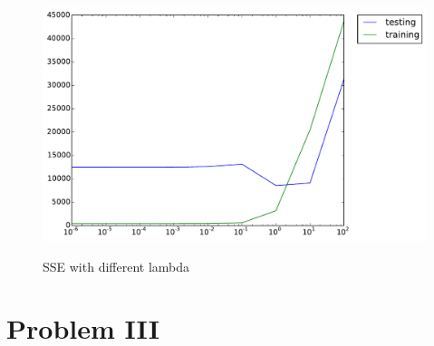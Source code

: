 \documentclass{article}
\begin{document}
    \begin{figure}[h]
      \begin{center}
      \includegraphics[scale=0.7]{SSE.pdf}\\
      \end{center}
      \caption{SSE with different lambda}
      \label{lambda}
    \end{figure}
    
    
\section*{Problem III}
\end{document}
